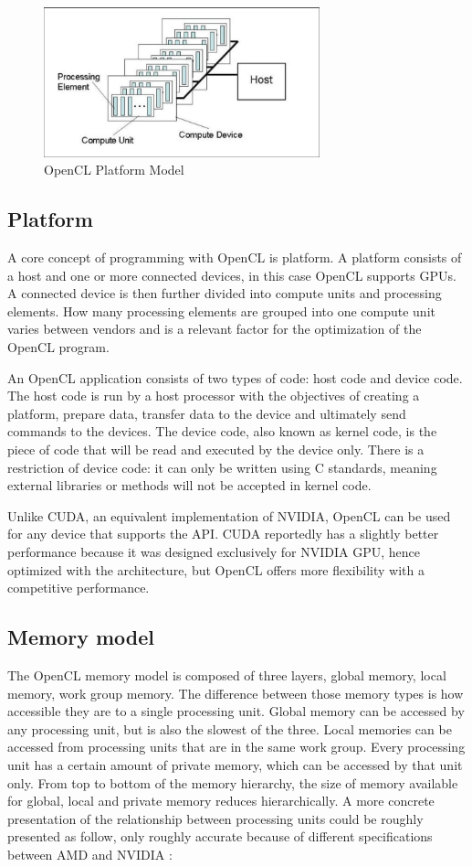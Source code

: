 \begin{figure}[H]
	\centering
	\includegraphics[width=8cm]{images/OpenCLModel.png}
	\caption{OpenCL Platform Model}
	\label{ExampleOCTImage}
\end{figure}
\pagebreak
\subsection{Platform}
A core concept of programming with OpenCL is platform. A platform consists of a host and one or more connected devices, in this case OpenCL supports GPUs. A connected device is then further divided into compute units and processing elements. How many processing elements  are grouped into one compute unit varies between vendors and is a relevant factor for the optimization of the OpenCL program. 

An OpenCL application consists of two types of code: host code and device code. The host code is run by a host processor with the objectives of creating a platform, prepare data, transfer data to the device and ultimately send commands to the devices. The device code, also known as kernel code, is the piece of code that will be read and executed by the device only. There is a restriction of device code: it can only be written using C standards, meaning external libraries or methods will not be accepted in kernel code. 

Unlike CUDA, an equivalent implementation of NVIDIA, OpenCL can be used for any device that supports the API. CUDA reportedly has a slightly better performance because it was  designed exclusively for NVIDIA GPU, hence optimized with the architecture, but OpenCL offers more flexibility with a competitive performance. 
\subsection{Memory model}
The OpenCL memory model is composed of three layers, global memory, local memory, work group memory. The difference between those memory types is how accessible they are to a single processing unit. Global memory can be accessed by any processing unit, but is also the slowest of the three. Local memories can be accessed from processing units that are in the same work group. Every processing unit has a certain amount of private memory, which can be accessed by that unit only. From top to bottom of the memory hierarchy, the size of memory available for global, local and private memory reduces hierarchically. A more concrete presentation of the relationship between processing units could be roughly presented as follow, only roughly accurate because of different specifications between AMD and NVIDIA \cite{openclplatform}:

